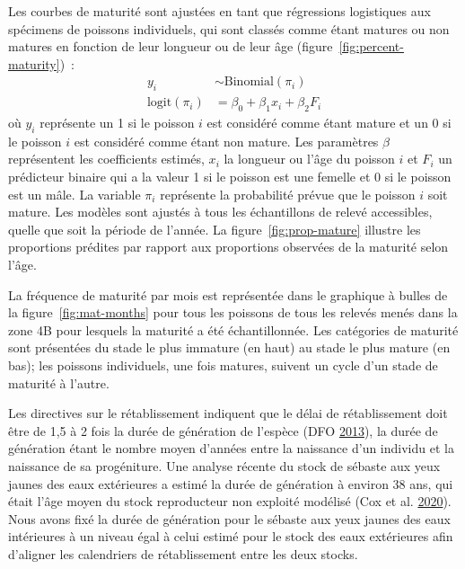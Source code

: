 \documentclass[11pt]{book}
\begin{document}
Les courbes de maturité sont ajustées en tant que régressions logistiques aux spécimens de poissons individuels, qui sont classés comme étant matures ou non matures en fonction de leur longueur ou de leur âge (figure~\ref{fig:percent-maturity})~:
\begin{align}
y_i &\sim \mathrm{Binomial}(\pi_i)\\
\mathrm{logit} \left( \pi_i \right) &= \beta_0 + \beta_1 x_i + \beta_2 F_i
\end{align}
où \(y_i\) représente un 1 si le poisson \(i\) est considéré comme étant mature et un 0 si le poisson \(i\) est considéré comme étant non mature. Les paramètres \(\beta\) représentent les coefficients estimés, \(x_i\) la longueur ou l'âge du poisson \(i\) et \(F_i\) un prédicteur binaire qui a la valeur 1 si le poisson est une femelle et 0 si le poisson est un mâle. La variable \(\pi_i\) représente la probabilité prévue que le poisson \(i\) soit mature. Les modèles sont ajustés à tous les échantillons de relevé accessibles, quelle que soit la période de l'année. La figure~\ref{fig:prop-mature} illustre les proportions prédites par rapport aux proportions observées de la maturité selon l'âge.



La fréquence de maturité par mois est représentée dans le graphique à bulles de la figure~\ref{fig:mat-months} pour tous les poissons de tous les relevés menés dans la zone 4B pour lesquels la maturité a été échantillonnée. Les catégories de maturité sont présentées du stade le plus immature (en haut) au stade le plus mature (en bas); les poissons individuels, une fois matures, suivent un cycle d'un stade de maturité à l'autre.

\hypertarget{sec:generation}{%
\label{sec:generation}}

Les directives sur le rétablissement indiquent que le délai de rétablissement doit être de 1,5 à 2 fois la durée de génération de l'espèce (DFO \protect\hyperlink{ref-dfo2013}{2013}), la durée de génération étant le nombre moyen d'années entre la naissance d'un individu et la naissance de sa progéniture. Une analyse récente du stock de sébaste aux yeux jaunes des eaux extérieures a estimé la durée de génération à environ 38 ans, qui était l'âge moyen du stock reproducteur non exploité modélisé (Cox et al. \protect\hyperlink{ref-cox2020}{2020}). Nous avons fixé la durée de génération pour le sébaste aux yeux jaunes des eaux intérieures à un niveau égal à celui estimé pour le stock des eaux extérieures afin d'aligner les calendriers de rétablissement entre les deux stocks.
\end{document}
